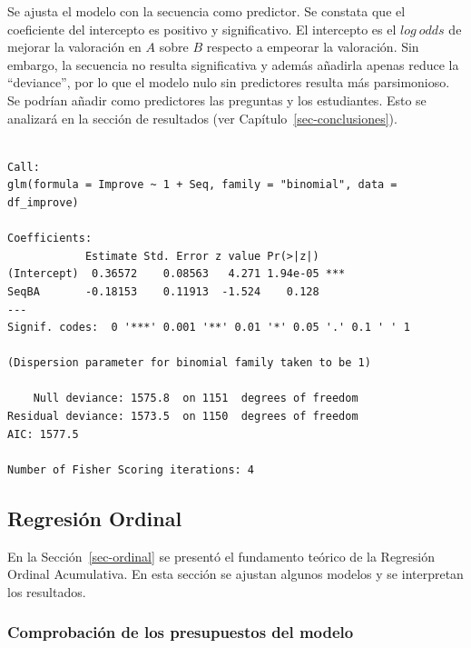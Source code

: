 \documentclass[
  12pt,
  a4paper,
  extrafontsizes,
  onecolumn,
  openright,
  table]{memoir}
\begin{document}
Se ajusta el modelo con la secuencia como predictor. Se constata que el
coeficiente del intercepto es positivo y significativo. El intercepto es
el \(log\ odds\) de mejorar la valoración en \(A\) sobre \(B\) respecto
a empeorar la valoración. Sin embargo, la secuencia no resulta
significativa y además añadirla apenas reduce la \enquote{deviance}, por
lo que el modelo nulo sin predictores resulta más parsimonioso. Se
podrían añadir como predictores las preguntas y los estudiantes. Esto se
analizará en la sección de resultados (ver
Capítulo~\ref{sec-conclusiones}).

\begin{verbatim}

Call:
glm(formula = Improve ~ 1 + Seq, family = "binomial", data = df_improve)

Coefficients:
            Estimate Std. Error z value Pr(>|z|)    
(Intercept)  0.36572    0.08563   4.271 1.94e-05 ***
SeqBA       -0.18153    0.11913  -1.524    0.128    
---
Signif. codes:  0 '***' 0.001 '**' 0.01 '*' 0.05 '.' 0.1 ' ' 1

(Dispersion parameter for binomial family taken to be 1)

    Null deviance: 1575.8  on 1151  degrees of freedom
Residual deviance: 1573.5  on 1150  degrees of freedom
AIC: 1577.5

Number of Fisher Scoring iterations: 4
\end{verbatim}

\hypertarget{sec-ordinal-2}{%
\subsection{Regresión Ordinal}\label{sec-ordinal-2}}

En la Sección~\ref{sec-ordinal} se presentó el fundamento teórico de la
Regresión Ordinal Acumulativa. En esta sección se ajustan algunos
modelos y se interpretan los resultados.

\hypertarget{comprobaciuxf3n-de-los-presupuestos-del-modelo}{%
\subsubsection{Comprobación de los presupuestos del
modelo}\label{comprobaciuxf3n-de-los-presupuestos-del-modelo}}
\end{document}
